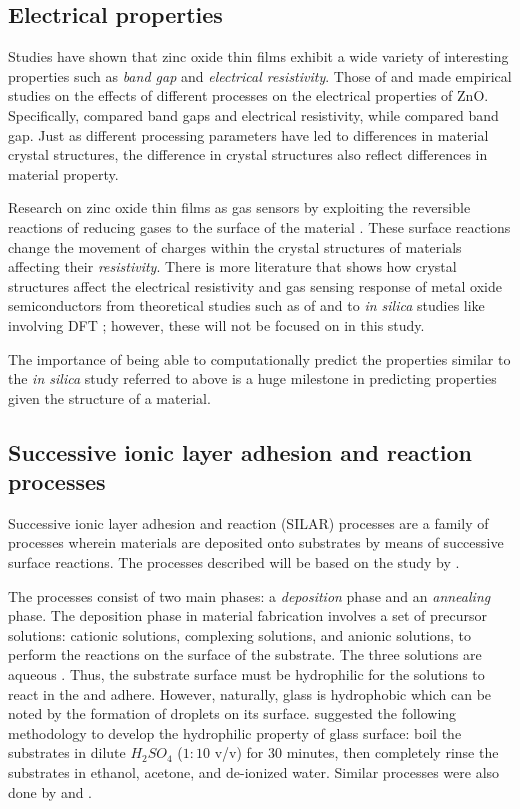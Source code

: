 \subsection{Electrical properties}

Studies have shown that zinc oxide thin films exhibit a wide variety of interesting properties such as  \emph{band gap} and \emph{electrical resistivity}.
Those of  and  made empirical studies on the effects of different processes on the electrical properties of ZnO.
Specifically,  compared band gaps and electrical resistivity, while  compared band gap.
Just as different processing parameters have led to differences in material crystal structures, the difference in crystal structures also reflect differences in material property.

Research on zinc oxide thin films as gas sensors by exploiting the reversible reactions of reducing gases to the surface of the material \cite{florido17}.
These surface reactions change the movement of charges within the crystal structures of materials affecting their \emph{resistivity}.
There is more literature that shows how crystal structures affect the electrical resistivity and gas sensing response of metal oxide semiconductors from theoretical studies such as of  and  to \textit{in silica} studies like involving DFT \cite{dft}; however, these will not be focused on in this study.

The importance of being able to computationally predict the properties similar to the \textit{in silica} study referred to above is a huge milestone in predicting properties given the structure of a material.

\subsection{Successive ionic layer adhesion and reaction processes}

Successive ionic layer adhesion and reaction (SILAR) processes are a family of processes wherein materials are deposited onto substrates by means of successive surface reactions.
The processes described will be based on the study by .

The processes consist of two main phases: a \emph{deposition} phase and an \emph{annealing} phase.
The deposition phase in material fabrication involves a set of precursor solutions: cationic solutions, complexing solutions, and anionic solutions, to perform the reactions on the surface of the substrate.
The three solutions are aqueous \cite{gao08}.
Thus, the substrate surface must be hydrophilic for the solutions to react in the and adhere.
However, naturally, glass is hydrophobic which can be noted by the formation of droplets on its surface.
 suggested the following methodology to develop the hydrophilic property of glass surface: boil the substrates in dilute $H_2SO_4$ ($1:10$ v/v) for $30$ minutes, then completely rinse the substrates in ethanol, acetone, and de-ionized water.
Similar processes were also done by  and .

